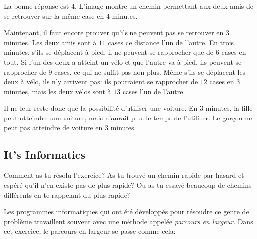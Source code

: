 \documentclass[a4paper,11pt]{report}
\newcommand{\taskGraphicsFolder}{..}
\begin{document}
La bonne réponse est $4$. L’image montre un chemin permettant aux deux amis de se retrouver sur la même case en $4$ minutes.

{\centering%
\par}

Maintenant, il faut encore prouver qu’ils ne peuvent pas se retrouver en $3$ minutes.
Les deux amis sont à $11$ cases de distance l’un de l’autre. En trois minutes, s’ils se déplacent à pied, il ne peuvent se rapprocher que de $6$ cases en tout.
Si l’un des deux a atteint un vélo et que l’autre va à pied, ils peuvent se rapprocher de $9$ cases, ce qui ne suffit pas non plus. Même s’ils se déplacent les deux à vélo, ils n’y arrivent pas: ils pourraient se rapprocher de $12$ cases en $3$ minutes, mais les deux vélos sont à $13$ cases l’un de l’autre.

Il ne leur reste donc que la possibilité d’utiliser une voiture. En $3$ minutes, la fille peut atteindre une voiture, mais n’aurait plus le temps de l’utiliser. Le garçon ne peut pas atteindre de voiture en $3$ minutes.


\subsection*{It’s Informatics}

Comment as-tu résolu l’exercice? As-tu trouvé un chemin rapide par hasard et espéré qu’il n’en existe pas de plus rapide? Ou as-tu essayé beaucoup de chemins différents en te rappelant du plus rapide?

Les programmes informatiques qui ont été développés pour résoudre ce genre de problème travaillent souvent avec une méthode appelée \emph{parcours en largeur}. Dans cet exercice, le parcours en largeur se passe comme cela:
\end{document}
